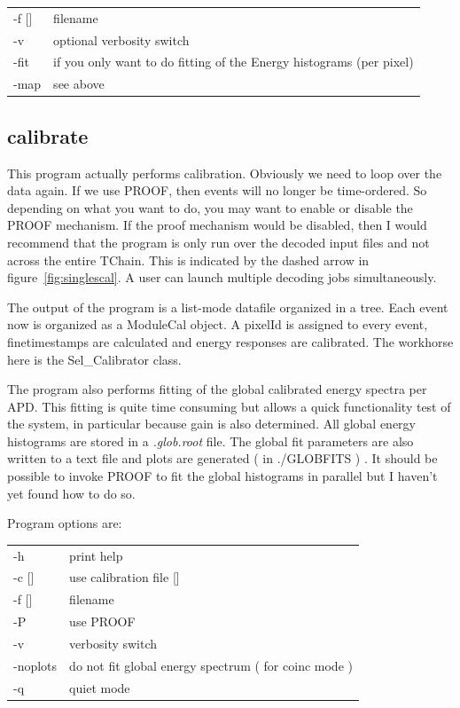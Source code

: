 \documentclass[12pt]{article}
\begin{document}
\begin{tabular}{ll}
-f []& filename\\
-v & optional verbosity switch\\
-fit & if you only want to do fitting of the Energy histograms (per pixel)\\
-map & see above\\
\end{tabular}

\subsection{calibrate}
This program actually performs calibration. Obviously we need to loop over the data again. If we use PROOF, then events will no longer be time-ordered. So depending on what you want to do, you may want to enable or disable the PROOF mechanism. If the proof mechanism would be disabled, then I would recommend that the program is only run over the decoded input files and not across the entire TChain. This is indicated by the dashed arrow in figure~\ref{fig:singlescal}. A user can launch multiple decoding jobs simultaneously. 

The output of the program is a list-mode datafile organized in a tree. Each event now is organized as a  ModuleCal object. A pixelId is assigned to every event, finetimestamps are calculated and energy responses are calibrated. The workhorse here is the Sel\_Calibrator class. 

The program also performs fitting of the global calibrated energy spectra per APD. This fitting is quite time consuming but allows a quick functionality test of the system, in particular because gain is also determined. All global energy histograms are stored in a {\em *.glob.root} file. The global fit parameters are also written to a text file and plots are generated ( in ./GLOBFITS ) . It should be possible to invoke PROOF to fit the global histograms in parallel but I haven't yet found how to do so. 

Program options are:\\
\begin{tabular}{ll}
-h & print help\\
-c []& use calibration file [] \\
-f []& filename \\
-P & use PROOF\\
-v & verbosity switch\\
-noplots & do not fit global energy spectrum ( for coinc mode )\\
-q & quiet mode\\
\end{tabular}
\end{document}
